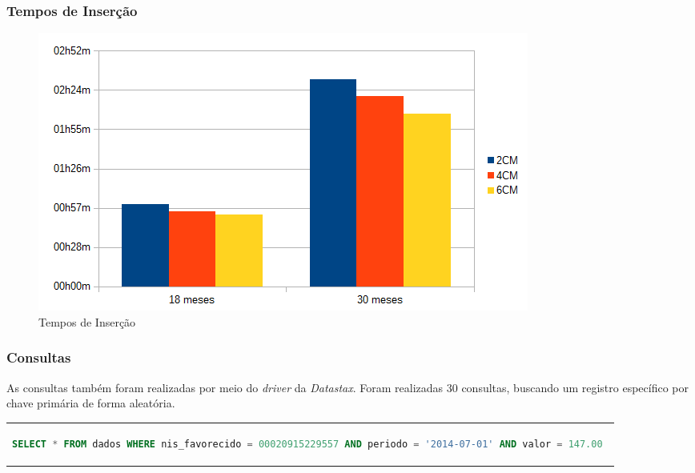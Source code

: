 \documentclass[brazil]{beamer}
\begin{document}
\begin{frame}
	\frametitle{Tempos de Inserção}
	
	\begin{figure}
		\includegraphics[width=0.7\linewidth]{figuras/graphinsert.png}
		\caption{Tempos de Inserção}
	\end{figure}
\end{frame}

\begin{frame}[fragile]
	\frametitle{Consultas}
	
	As consultas também foram realizadas por meio do \emph{driver} da \emph{Datastax}. Foram realizadas 30 consultas, buscando um registro específico por chave primária de forma aleatória.
	
	\begin{tabular}{c}
		\begin{lstlisting}[caption={Código CQL para consulta},language=SQL]
		SELECT * FROM dados WHERE nis_favorecido = 00020915229557 AND periodo = '2014-07-01' AND valor = 147.00 
		\end{lstlisting}
	\end{tabular}
\end{frame}
\end{document}
